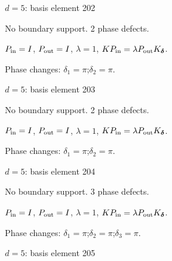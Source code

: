 \vfill
{\footnotesize\texttt{}}
\newpage
{}
{\Large $d=5$: basis element 202}\par
No boundary support. 2 phase defects.
\begin{center}
\end{center}
\vspace{-1mm}
$P_{\rm in}=I$, \quad $P_{\rm out}=I$, \quad $\lambda=1$, \qquad $K P_{\rm in}=\lambda P_{\rm out}K_{\boldsymbol\delta}$.
\par\smallskip\begin{minipage}{.98\linewidth}\small Phase changes: $\delta_{1}=\pi$;\quad $\delta_{2}=\pi$.\end{minipage}
\vfill
{\footnotesize\texttt{}}
\newpage
{}
{\Large $d=5$: basis element 203}\par
No boundary support. 2 phase defects.
\begin{center}
\end{center}
\vspace{-1mm}
$P_{\rm in}=I$, \quad $P_{\rm out}=I$, \quad $\lambda=1$, \qquad $K P_{\rm in}=\lambda P_{\rm out}K_{\boldsymbol\delta}$.
\par\smallskip\begin{minipage}{.98\linewidth}\small Phase changes: $\delta_{1}=\pi$;\quad $\delta_{2}=\pi$.\end{minipage}
\vfill
{\footnotesize\texttt{}}
\newpage
{}
{\Large $d=5$: basis element 204}\par
No boundary support. 3 phase defects.
\begin{center}
\end{center}
\vspace{-1mm}
$P_{\rm in}=I$, \quad $P_{\rm out}=I$, \quad $\lambda=1$, \qquad $K P_{\rm in}=\lambda P_{\rm out}K_{\boldsymbol\delta}$.
\par\smallskip\begin{minipage}{.98\linewidth}\small Phase changes: $\delta_{1}=\pi$;\quad $\delta_{2}=\pi$;\quad $\delta_{3}=\pi$.\end{minipage}
\vfill
{\footnotesize\texttt{}}
\newpage
{}
{\Large $d=5$: basis element 205}\par
